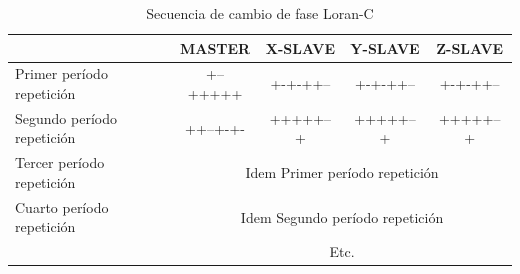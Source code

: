 \begin{table}[!h]
  \centering
\caption{Secuencia de cambio de fase Loran-C \protect\cite{Loran1962}}
\label{tab:06.Loran.C.secuencia.cambio.fase}

  \begin{tabular}{lcccc} \hline
  &MASTER &X-SLAVE& Y-SLAVE& Z-SLAVE \\ \hline
Primer per\'iodo repetici\'on &+--+++++ &+-+-++-- &+-+-++-- &+-+-++-- \\ 
Segundo per\'iodo repetici\'on &++--+-+- &+++++--+ &+++++--+ &+++++--+ \\
Tercer per\'iodo repetici\'on & \multicolumn{4}{c}{Idem Primer per\'iodo repetici\'on}\\
Cuarto per\'iodo repetici\'on & \multicolumn{4}{c}{Idem Segundo per\'iodo repetici\'on}\\
& \multicolumn{4}{c}{Etc.} \\ \hline
\end{tabular}
\end{table}





